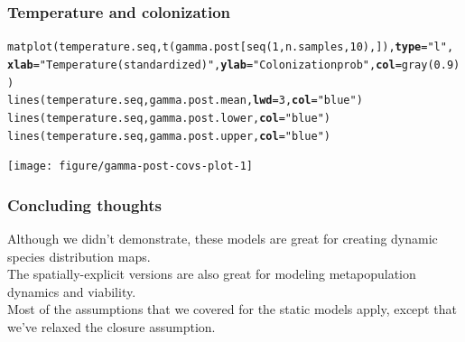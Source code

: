 \documentclass[color=usenames,dvipsnames]{beamer}\usepackage[]{graphicx}\usepackage[]{color}
\makeatletter
\newcommand{\hlnum}[1]{\textcolor[rgb]{0.69,0.494,0}{#1}}%
\newcommand{\hlstr}[1]{\textcolor[rgb]{0.749,0.012,0.012}{#1}}%
\newcommand{\hlstd}[1]{\textcolor[rgb]{0,0,0}{#1}}%
\newcommand{\hlkwc}[1]{\textcolor[rgb]{0,0,0}{\textbf{#1}}}%
\newcommand{\hlkwd}[1]{\textcolor[rgb]{0.004,0.004,0.506}{#1}}%
\newenvironment{kframe}{%
 \def\at@end@of@kframe{}%
 \ifinner\ifhmode%
  \def\at@end@of@kframe{\end{minipage}}%
  \begin{minipage}{\columnwidth}%
 \fi\fi%
 \def\FrameCommand##1{\hskip\@totalleftmargin \hskip-\fboxsep
 \colorbox{shadecolor}{##1}\hskip-\fboxsep
     \hskip-\linewidth \hskip-\@totalleftmargin \hskip\columnwidth}%
 \MakeFramed {\advance\hsize-\width
   \@totalleftmargin\z@ \linewidth\hsize
   \@setminipage}}%
 {\par\unskip\endMakeFramed%
 \at@end@of@kframe}
\newenvironment{knitrout}{}{} %
\makeatother
\begin{document}
\begin{frame}[fragile]
  \frametitle{Temperature and colonization}
\begin{knitrout}\scriptsize
{}\color{fgcolor}\begin{kframe}
\begin{alltt}
\hlkwd{matplot}\hlstd{(temperature.seq,} \hlkwd{t}\hlstd{(gamma.post[}\hlkwd{seq}\hlstd{(}\hlnum{1}\hlstd{,n.samples,}\hlnum{10}\hlstd{),]),} \hlkwc{type}\hlstd{=}\hlstr{"l"}\hlstd{,}
        \hlkwc{xlab}\hlstd{=}\hlstr{"Temperature (standardized)"}\hlstd{,} \hlkwc{ylab}\hlstd{=}\hlstr{"Colonization prob"}\hlstd{,} \hlkwc{col}\hlstd{=}\hlkwd{gray}\hlstd{(}\hlnum{0.9}\hlstd{))}
\hlkwd{lines}\hlstd{(temperature.seq, gamma.post.mean,} \hlkwc{lwd}\hlstd{=}\hlnum{3}\hlstd{,} \hlkwc{col}\hlstd{=}\hlstr{"blue"}\hlstd{)}
\hlkwd{lines}\hlstd{(temperature.seq, gamma.post.lower,} \hlkwc{col}\hlstd{=}\hlstr{"blue"}\hlstd{)}
\hlkwd{lines}\hlstd{(temperature.seq, gamma.post.upper,} \hlkwc{col}\hlstd{=}\hlstr{"blue"}\hlstd{)}
\end{alltt}
\end{kframe}

{\centering \texttt{[image: figure/gamma-post-covs-plot-1]} 

}


\end{knitrout}
\end{frame}







\begin{frame}
  \frametitle{Concluding thoughts}
  Although we didn't demonstrate, these models are great for creating
  dynamic species distribution maps. \\
  \pause
  \vfill
  The spatially-explicit versions are also great for modeling
  metapopulation dynamics and viability. \\
  \pause
  \vfill
  Most of the assumptions that we covered for the static models apply,
  except that we've relaxed the closure assumption.
\end{frame}
\end{document}

